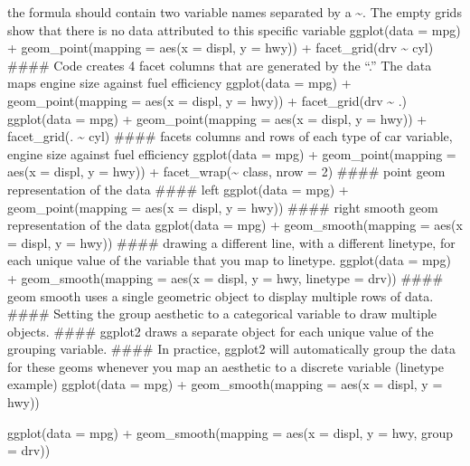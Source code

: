 \documentclass[
]{article}
\begin{document}
the formula should contain two variable names separated by a
\textasciitilde. The empty grids show that there is no data attributed
to this specific variable ggplot(data = mpg) + geom\_point(mapping =
aes(x = displ, y = hwy)) + facet\_grid(drv \textasciitilde{} cyl)
\#\#\#\# Code creates 4 facet columns that are generated by the ``.''
The data maps engine size against fuel efficiency ggplot(data = mpg) +
geom\_point(mapping = aes(x = displ, y = hwy)) + facet\_grid(drv
\textasciitilde{} .) ggplot(data = mpg) + geom\_point(mapping = aes(x =
displ, y = hwy)) + facet\_grid(. \textasciitilde{} cyl) \#\#\#\# facets
columns and rows of each type of car variable, engine size against fuel
efficiency ggplot(data = mpg) + geom\_point(mapping = aes(x = displ, y =
hwy)) + facet\_wrap(\textasciitilde{} class, nrow = 2) \#\#\#\# point
geom representation of the data \#\#\#\# left ggplot(data = mpg) +
geom\_point(mapping = aes(x = displ, y = hwy)) \#\#\#\# right smooth
geom representation of the data ggplot(data = mpg) +
geom\_smooth(mapping = aes(x = displ, y = hwy)) \#\#\#\# drawing a
different line, with a different linetype, for each unique value of the
variable that you map to linetype. ggplot(data = mpg) +
geom\_smooth(mapping = aes(x = displ, y = hwy, linetype = drv)) \#\#\#\#
geom smooth uses a single geometric object to display multiple rows of
data. \#\#\#\# Setting the group aesthetic to a categorical variable to
draw multiple objects. \#\#\#\# ggplot2 draws a separate object for each
unique value of the grouping variable. \#\#\#\# In practice, ggplot2
will automatically group the data for these geoms whenever you map an
aesthetic to a discrete variable (linetype example) ggplot(data = mpg) +
geom\_smooth(mapping = aes(x = displ, y = hwy))

ggplot(data = mpg) + geom\_smooth(mapping = aes(x = displ, y = hwy,
group = drv))
\end{document}
